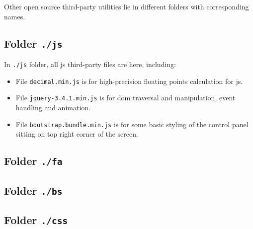 Other open source third-party utilities lie in different folders with corresponding names.

\subsection{Folder \texttt{./js}}

In \texttt{./js} folder, all \gls{js} third-party files are here, including:

\begin{itemize}
    \item File \texttt{decimal.min.js} is for high-precision floating points calculation for \acrfull{js}.
    \item File \texttt{jquery-3.4.1.min.js} is for \gls{dom} traversal and manipulation, event handling and animation.
    \item File \texttt{bootstrap.bundle.min.js} is for some basic styling of the control panel sitting on top right corner of the screen.
\end{itemize}

\subsection{Folder \texttt{./fa}}

\subsection{Folder \texttt{./bs}}

\subsection{Folder \texttt{./css}}